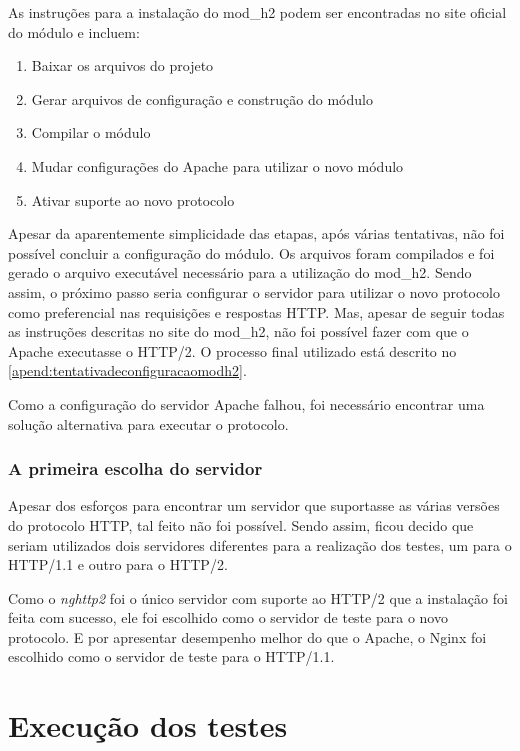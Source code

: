 As instruções para a instalação do mod\_h2 podem ser encontradas no site oficial do módulo e incluem:
\begin{enumerate}
	\item Baixar os arquivos do projeto
	\item Gerar arquivos de configuração e construção do módulo
	\item Compilar o módulo
	\item Mudar configurações do Apache para utilizar o novo módulo
	\item Ativar suporte ao novo protocolo
\end{enumerate}

Apesar da aparentemente simplicidade das etapas, após várias tentativas, não foi possível concluir a configuração do módulo. Os arquivos foram compilados e foi gerado o arquivo executável necessário para a utilização do mod\_h2. Sendo assim, o próximo passo seria configurar o servidor para utilizar o novo protocolo como preferencial nas requisições e respostas HTTP. Mas, apesar de seguir todas as instruções descritas no site do mod\_h2, não foi possível fazer com que o Apache executasse o HTTP/2. O processo final utilizado está descrito no \autoref{apend:tentativadeconfiguracaomodh2}.

Como a configuração do servidor Apache falhou, foi necessário encontrar uma solução alternativa para executar o protocolo.

\subsubsection{A primeira escolha do servidor}
\label{aprimeiraescolhadoservidor}

Apesar dos esforços para encontrar um servidor que suportasse as várias versões do protocolo HTTP, tal feito não foi possível. Sendo assim, ficou decido que seriam utilizados dois servidores diferentes para a realização dos testes, um para o HTTP/1.1 e outro para o HTTP/2.

Como o \textit{nghttp2} foi o único servidor com suporte ao HTTP/2 que a instalação foi feita com sucesso, ele foi escolhido como o servidor de teste para o novo protocolo. E por apresentar desempenho melhor do que o Apache, o Nginx foi escolhido como o servidor de teste para o HTTP/1.1.


\section{Execução dos testes}
\label{execuçãodostestes}

